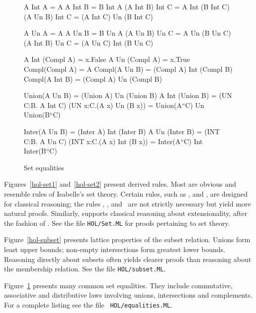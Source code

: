 \begin{figure} \underscoreon   \hfuzz=4pt%
\begin{ttbox}
        A Int A = A
       A Int B = B Int A
         (A Int B) Int C  =  A Int (B Int C)
    (A Un B)  Int C  =  (A Int C) Un (B Int C)

         A Un A = A
        A Un B = B Un A
          (A Un B)  Un C  =  A Un (B Un C)
    (A Int B) Un C  =  (A Un C) Int (B Un C)

    A Int (Compl A) = {\ttlbrace}x.False{\ttrbrace}
   A Un  (Compl A) = {\ttlbrace}x.True{\ttrbrace}
 Compl(Compl A) = A
          Compl(A Un B)  = (Compl A) Int (Compl B)
         Compl(A Int B) = (Compl A) Un (Compl B)

  Union(A Un B) = (Union A) Un (Union B)
         A Int (Union B) = (UN C:B. A Int C)
    (UN x:C.(A x) Un (B x)) = Union(A``C) Un Union(B``C)

  Inter(A Un B) = (Inter A) Int (Inter B)
          A Un (Inter B) = (INT C:B. A Un C)
   (INT x:C.(A x) Int (B x)) = Inter(A``C) Int Inter(B``C)
\end{ttbox}
\caption{Set equalities} \label{hol-equalities}
\end{figure}


Figures~\ref{hol-set1} and~\ref{hol-set2} present derived rules.  Most are
obvious and resemble rules of Isabelle's {\ZF} set theory.  Certain rules,
such as ,  and ,
are designed for classical reasoning; the rules ,
,  and~ are not
strictly necessary but yield more natural proofs.  Similarly,
 supports classical reasoning about extensionality,
after the fashion of .  See the file \texttt{HOL/Set.ML} for
proofs pertaining to set theory.

Figure~\ref{hol-subset} presents lattice properties of the subset relation.
Unions form least upper bounds; non-empty intersections form greatest lower
bounds.  Reasoning directly about subsets often yields clearer proofs than
reasoning about the membership relation.  See the file \texttt{HOL/subset.ML}.

Figure~\ref{hol-equalities} presents many common set equalities.  They
include commutative, associative and distributive laws involving unions,
intersections and complements.  For a complete listing see the file {\tt
HOL/equalities.ML}.

